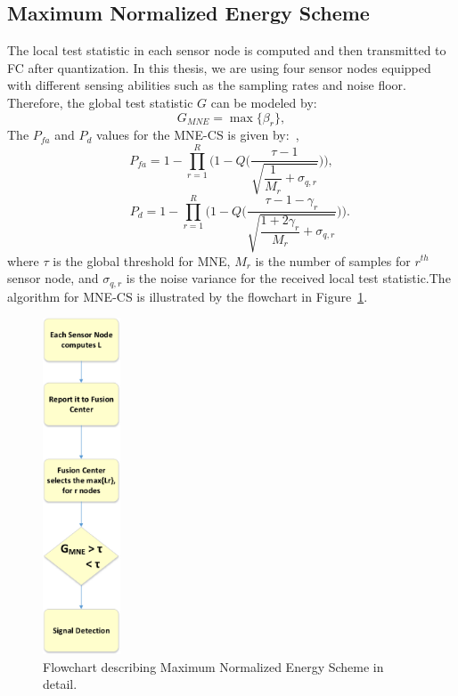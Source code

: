 \subsection{Maximum Normalized Energy Scheme}
The local test statistic in each sensor node is computed and then transmitted to FC after quantization. In this thesis, we are using four sensor nodes equipped with different sensing abilities such as the sampling rates and noise floor. Therefore, the global test statistic $G$ can be modeled by:
\begin{equation}
\label{eq:8}
G_{MNE} = \max\{\beta_r\},
\end{equation}
The $P_{fa}$ and $P_d$ values for the MNE-CS is given by:~\cite{ref:12},
\begin{equation}
\label{eq:9}
P_{fa} = 1-\prod_{r=1}^R\Bigg(1-Q\Bigg(\dfrac{\tau-1}{\sqrt{\dfrac{1}{M_r}+\sigma_{q,r}}}\Bigg)\Bigg),
\end{equation}
\begin{equation}
\label{eq:10}
~~~~~~P_d = 1-\prod_{r=1}^R\Bigg(1-Q\Bigg(\dfrac{\tau-1-\gamma_r}{\sqrt{\dfrac{1+2\gamma_r}{M_r}+\sigma_{q,r}}}\Bigg)\Bigg).
\end{equation}
where $\tau$ is the global threshold for MNE, $M_r$ is the number of samples for $r^{th}$ sensor node, and $\sigma_{q,r}$ is the noise variance for the received local test statistic.The algorithm for MNE-CS is illustrated by the flowchart in Figure~\ref{mnescheme}.


\begin{figure}[ht!]
	\centering
	\includegraphics[width=\textwidth,height=10cm,keepaspectratio]{images/Gill/figs/mnescheme.eps}
\caption{Flowchart describing Maximum Normalized Energy Scheme in detail.} 
\label{mnescheme}      
\end{figure}



